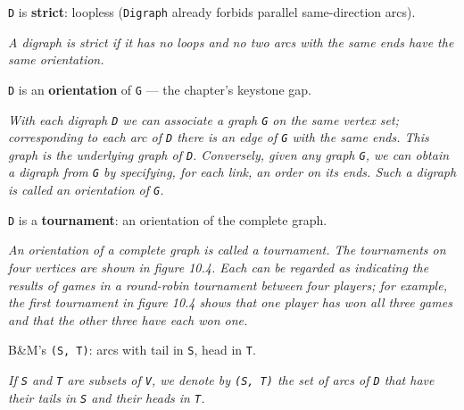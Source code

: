 \begin{definition}
\label{Digraph.IsStrict}
\leanok
\texttt{D} is \textbf{strict}: loopless (\texttt{Digraph} already forbids parallel same-direction arcs).

\emph{A digraph is strict if it has no loops
and no two arcs with the same ends have the same orientation.}
\end{definition}

\begin{definition}
\label{Digraph.IsOrientationOf}
\leanok
\texttt{D} is an \textbf{orientation} of \texttt{G} --- the chapter's keystone gap.

\emph{With each digraph \texttt{D} we can associate
a graph \texttt{G} on the same vertex set; corresponding to each arc of \texttt{D} there
is an
edge of \texttt{G} with the same ends. This graph is the underlying graph of \texttt{D}.
Conversely, given any graph \texttt{G}, we can obtain a digraph from \texttt{G} by
specifying,
for each link, an order on its ends.  Such a digraph is called an orientation of
\texttt{G}.}
\end{definition}

\begin{definition}
\label{Digraph.IsTournament}
\leanok
\texttt{D} is a \textbf{tournament}: an orientation of the complete graph.

\emph{An orientation of a complete graph is
called a tournament.  The tournaments on four vertices are shown in figure 10.4.
Each can be regarded as indicating the results of games in a round-robin tournament
between four players; for example, the first tournament in figure 10.4 shows that
one player has won all three games and that the other three have each won one.}
\end{definition}

\begin{definition}
\label{Digraph.arcsBetween}
\leanok
B\&M's \texttt{(S, T)}: arcs with tail in \texttt{S}, head in \texttt{T}.

\emph{If \texttt{S} and \texttt{T} are subsets of \texttt{V}, we
denote by \texttt{(S, T)} the set of arcs of \texttt{D} that have their tails in
\texttt{S} and their
heads in \texttt{T}.}
\end{definition}


